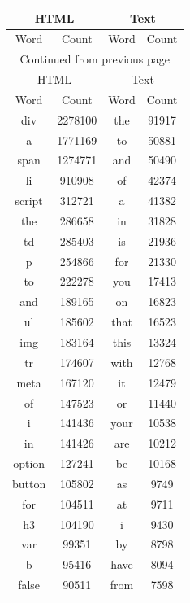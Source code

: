 \documentclass[12pt]{article}
\begin{document}
\begin{longtable}{|c|c|c|c|}
    \hline
    \multicolumn{2}{|c}{HTML} & \multicolumn{2}{|c|}{Text}\\
    \hline
    Word & Count & Word & Count \\
    \hline
    \endfirsthead
    \multicolumn{4}{c}{Continued from previous page}\\
    \hline
    \multicolumn{2}{|c}{HTML} & \multicolumn{2}{|c|}{Text}\\
    \hline
    Word & Count & Word & Count \\
    \hline
    \endhead
    div & 2278100 & the & 91917 \\
    \hline
    a & 1771169 & to & 50881 \\
    \hline
    span & 1274771 & and & 50490 \\
    \hline
    li & 910908 & of & 42374 \\
    \hline
    script & 312721 & a & 41382 \\
    \hline
    the & 286658 & in & 31828 \\
    \hline
    td & 285403 & is & 21936 \\
    \hline
    p & 254866 & for & 21330 \\
    \hline
    to & 222278 & you & 17413 \\
    \hline
    and & 189165 & on & 16823 \\
    \hline
    ul & 185602 & that & 16523 \\
    \hline
    img & 183164 & this & 13324 \\
    \hline
    tr & 174607 & with & 12768 \\
    \hline
    meta & 167120 & it & 12479 \\
    \hline
    of & 147523 & or & 11440 \\
    \hline
    i & 141436 & your & 10538 \\
    \hline
    in & 141426 & are & 10212 \\
    \hline
    option & 127241 & be & 10168 \\
    \hline
    button & 105802 & as & 9749 \\
    \hline
    for & 104511 & at & 9711 \\
    \hline
    h3 & 104190 & i & 9430 \\
    \hline
    var & 99351 & by & 8798 \\
    \hline
    b & 95416 & have & 8094 \\
    \hline
    false & 90511 & from & 7598 \\

\end{longtable}
\end{document}
